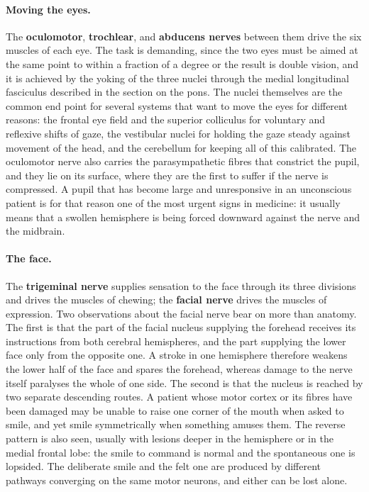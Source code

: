 \documentclass[11pt]{article}
\begin{document}
\paragraph{Moving the eyes.} The \textbf{oculomotor}, \textbf{trochlear}, and \textbf{abducens nerves} between them drive the six muscles of each eye. The task is demanding, since the two eyes must be aimed at the same point to within a fraction of a degree or the result is double vision, and it is achieved by the yoking of the three nuclei through the medial longitudinal fasciculus described in the section on the pons. The nuclei themselves are the common end point for several systems that want to move the eyes for different reasons: the frontal eye field and the superior colliculus for voluntary and reflexive shifts of gaze, the vestibular nuclei for holding the gaze steady against movement of the head, and the cerebellum for keeping all of this calibrated. The oculomotor nerve also carries the parasympathetic fibres that constrict the pupil, and they lie on its surface, where they are the first to suffer if the nerve is compressed. A pupil that has become large and unresponsive in an unconscious patient is for that reason one of the most urgent signs in medicine: it usually means that a swollen hemisphere is being forced downward against the nerve and the midbrain.

\paragraph{The face.} The \textbf{trigeminal nerve} supplies sensation to the face through its three divisions and drives the muscles of chewing; the \textbf{facial nerve} drives the muscles of expression. Two observations about the facial nerve bear on more than anatomy. The first is that the part of the facial nucleus supplying the forehead receives its instructions from both cerebral hemispheres, and the part supplying the lower face only from the opposite one. A stroke in one hemisphere therefore weakens the lower half of the face and spares the forehead, whereas damage to the nerve itself paralyses the whole of one side. The second is that the nucleus is reached by two separate descending routes. A patient whose motor cortex or its fibres have been damaged may be unable to raise one corner of the mouth when asked to smile, and yet smile symmetrically when something amuses them. The reverse pattern is also seen, usually with lesions deeper in the hemisphere or in the medial frontal lobe: the smile to command is normal and the spontaneous one is lopsided. The deliberate smile and the felt one are produced by different pathways converging on the same motor neurons, and either can be lost alone.
\end{document}
